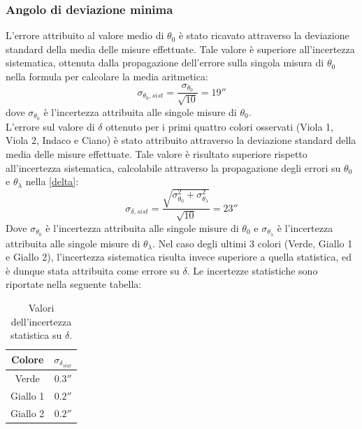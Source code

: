\documentclass[]{article}
\begin{document}
    \subsubsection{Angolo di deviazione minima}
    L'errore attribuito al valore medio di $\theta_0$ è stato ricavato attraverso la deviazione standard della media delle misure effettuate. Tale valore è superiore all'incertezza sistematica, ottenuta dalla propagazione dell'errore sulla singola misura di $\theta_0$ nella formula per calcolare la media aritmetica:
    \begin{equation}
        \label{theta0-err-sist}
        \sigma_{\theta_0,sist} = \frac{\sigma_{\theta_0}}{\sqrt{10}} = 19''
    \end{equation}
    dove $\sigma_{\theta_0}$ è l'incertezza attribuita alle singole misure di $\theta_0$.\\
    L'errore sul valore di $\delta$ ottenuto per i primi quattro colori osservati (Viola 1, Viola 2, Indaco e Ciano) è stato attribuito attraverso la deviazione standard della media delle misure effettuate. Tale valore è risultato superiore rispetto all'incertezza sistematica, calcolabile attraverso la propagazione degli errori su $\theta_0$ e $\theta_{\lambda}$ nella \ref{delta}:
    \begin{equation}
        \label{delta-err-sist}
        \sigma_{\delta, sist}= \frac{\sqrt{ \sigma_{\theta_0}^2 + \sigma_{\theta_{\lambda}}^2 }}{\sqrt{10}} = 23''
    \end{equation}
    Dove $\sigma_{\theta_0}$ è l'incertezza attribuita alle singole misure di $\theta_0$ e $\sigma_{\theta_{\lambda}}$ è l'incertezza attribuita alle singole misure di $\theta_{\lambda}$.
    Nel caso degli ultimi 3 colori (Verde, Giallo 1 e Giallo 2), l'incertezza sistematica risulta invece superiore a quella statistica, ed è dunque stata attribuita come errore su $\delta$. Le incertezze statistiche sono riportate nella seguente tabella:
    \begin{table} [H]
        \centering
        \begin{tabular}{||c|c||}
            \hline
            Colore & $\sigma_{\delta_{stat}}$\\
            \hline \hline
            Verde    & $ 0.3'' $ \\\hline
            Giallo 1 & $ 0.2'' $ \\\hline
            Giallo 2 & $ 0.2'' $ \\\hline
        \end{tabular}
        \caption{Valori dell'incertezza statistica su $\delta$.}
        \label{d-err-stat}
    \end{table}
    \label{par:dev_min_err}
\end{document}
